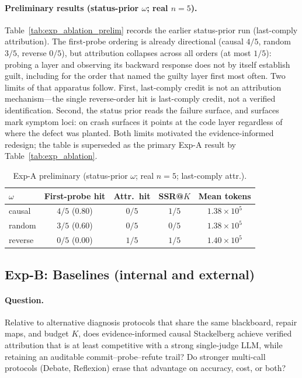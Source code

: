 \documentclass[a4paper,fleqn]{cas-sc}
\begin{document}
\paragraph{Preliminary results (status-prior $\omega$; real $n{=}5$).}
Table~\ref{tab:exp_ablation_prelim} records the earlier status-prior run
(last-comply attribution). The first-probe ordering is already directional
(causal $4/5$, random $3/5$, reverse $0/5$), but attribution collapses
across all orders (at most $1/5$): probing a layer and observing its
backward response does not by itself establish guilt, including for the
order that named the guilty layer first most often. Two limits of that
apparatus follow. First, last-comply credit is not an attribution
mechanism---the single reverse-order hit is last-comply credit, not a
verified identification. Second, the status prior reads the failure
surface, and surfaces mark symptom loci: on crash surfaces it points at
the code layer regardless of where the defect was planted. Both limits
motivated the evidence-informed redesign; the table is superseded as the
primary Exp-A result by Table~\ref{tab:exp_ablation}.

\begin{table}[t]
\centering
\caption{Exp-A preliminary (status-prior $\omega$; real $n{=}5$; last-comply attr.).}
\label{tab:exp_ablation_prelim}
\label{tab:exp_i_prelim}
\begin{tabular}{@{}l c c c c@{}}
\toprule
$\omega$ & First-probe hit & Attr.\ hit & SSR@$K$ & Mean tokens \\
\midrule
causal  & $4/5$ (0.80) & $0/5$ & $1/5$ & $1.38{\times}10^{5}$ \\
random  & $3/5$ (0.60) & $0/5$ & $0/5$ & $1.38{\times}10^{5}$ \\
reverse & $0/5$ (0.00) & $1/5$ & $1/5$ & $1.40{\times}10^{5}$ \\
\bottomrule
\end{tabular}
\end{table}

\subsection{Exp-B: Baselines (internal and external)}
\label{sec:exp_baselines}
\label{sec:exp_ii}
\label{sec:exp_iii}

\paragraph{Question.}
Relative to alternative diagnosis protocols that share the same blackboard,
repair maps, and budget $K$, does evidence-informed causal Stackelberg
achieve verified attribution that is at least competitive with a strong
single-judge LLM, while retaining an auditable commit--probe--refute trail?
Do stronger multi-call protocols (Debate, Reflexion) erase that advantage on
accuracy, cost, or both?
\end{document}
